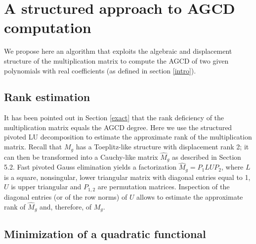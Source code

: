 \documentclass{article}
\begin{document}
\section{A structured approach to AGCD computation}

We propose here an algorithm that exploits the algebraic and displacement
structure of the multiplication matrix to compute the AGCD of two given
polynomials with real coefficients (as defined in section \ref{intro}).

\subsection{Rank estimation}

It has been pointed out in Section \ref{exact} that the rank deficiency of the
multiplication matrix equals the AGCD degree. Here we use the structured
pivoted LU decomposition to estimate the approximate rank of the
multiplication matrix. Recall that $M_g$ has a Toeplitz-like structure with
displacement rank 2; it can then be transformed into a Cauchy-like matrix
$\hat{M}_g$ as described in Section 5.2. Fast pivoted Gauss elimination yields
a factorization $\hat{M}_g = P_1 L U P_2$, where $L$ is a square, nonsingular,
lower triangular matrix with diagonal entries equal to 1, $U$ is upper
triangular and $P_{1, 2}$ are permutation matrices. Inspection of the diagonal
entries (or of the row norms) of $U$ allows to estimate the approximate rank
of $\hat{M}_g$ and, therefore, of $M_g$.

\subsection{Minimization of a quadratic functional}
\end{document}
